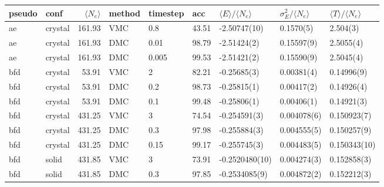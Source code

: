 \begin{tabular}{llrllllll}
\toprule
pseudo &     conf &  $\langle N_e\rangle$ & method & timestep &    acc & $\langle E\rangle/\langle N_e\rangle$ & $\sigma_E^2/\langle N_e\rangle$ & $\langle T\rangle/\langle N_e\rangle$ \\
\midrule
    ae &  crystal &                161.93 &    VMC &      0.8 &  43.51 &                          -2.50747(10) &                       0.1570(5) &                              2.504(3) \\
    ae &  crystal &                161.93 &    DMC &     0.01 &  98.79 &                           -2.51424(2) &                      0.15597(9) &                             2.5055(4) \\
    ae &  crystal &                161.93 &    DMC &    0.005 &  99.53 &                           -2.51421(2) &                      0.15590(9) &                             2.5045(4) \\
   bfd &  crystal &                 53.91 &    VMC &        2 &  82.21 &                           -0.25685(3) &                      0.00381(4) &                            0.14996(9) \\
   bfd &  crystal &                 53.91 &    DMC &      0.2 &  98.73 &                           -0.25815(1) &                      0.00417(2) &                            0.14926(4) \\
   bfd &  crystal &                 53.91 &    DMC &      0.1 &  99.48 &                           -0.25806(1) &                      0.00406(1) &                            0.14921(3) \\
   bfd &  crystal &                431.25 &    VMC &        3 &  74.54 &                          -0.254591(3) &                     0.004078(6) &                           0.150923(7) \\
   bfd &  crystal &                431.25 &    DMC &      0.3 &  97.98 &                          -0.255884(3) &                     0.004555(5) &                           0.150257(9) \\
   bfd &  crystal &                431.25 &    DMC &     0.15 &  99.17 &                          -0.255745(3) &                     0.004483(5) &                          0.150343(10) \\
   bfd &    solid &                431.85 &    VMC &        3 &  73.91 &                        -0.2520480(10) &                     0.004274(3) &                           0.152858(3) \\
   bfd &    solid &                431.85 &    DMC &      0.3 &  97.85 &                         -0.2534085(9) &                     0.004872(2) &                           0.152212(3) \\

\end{tabular}
